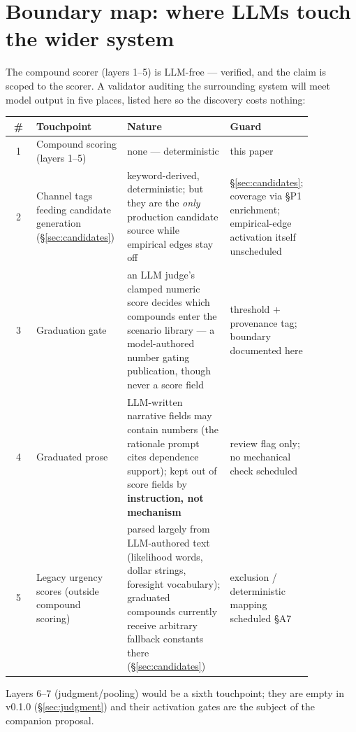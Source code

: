 \documentclass[11pt]{article}
\begin{document}
\section{Boundary map: where LLMs touch the wider system}
\label{app:boundary}

The compound scorer (layers 1--5) is LLM-free --- verified, and the claim is
scoped to the scorer. A validator auditing the surrounding system will meet
model output in five places, listed here so the discovery costs nothing:

\begin{center}\small
\begin{tabular}{@{}cp{0.30\linewidth}p{0.34\linewidth}p{0.22\linewidth}@{}}
\toprule
\# & Touchpoint & Nature & Guard \\
\midrule
1 & Compound scoring (layers 1--5) & none --- deterministic & this paper \\
2 & Channel tags feeding candidate generation (\S\ref{sec:candidates}) &
keyword-derived, deterministic; but they are the \emph{only} production
candidate source while empirical edges stay off & \S\ref{sec:candidates};
coverage via \S P1 enrichment; empirical-edge activation itself
unscheduled \\
3 & Graduation gate & an LLM judge's clamped numeric score decides which
compounds enter the scenario library --- a model-authored number gating
publication, though never a score field & threshold + provenance tag;
boundary documented here \\
4 & Graduated prose & LLM-written narrative fields may contain numbers (the
rationale prompt cites dependence support); kept out of score fields by
\textbf{instruction, not mechanism} & review flag only; no mechanical check
scheduled \\
5 & Legacy urgency scores (outside compound scoring) & parsed largely from
LLM-authored text (likelihood words, dollar strings, foresight vocabulary);
graduated compounds currently receive arbitrary fallback constants there
(\S\ref{sec:candidates}) & exclusion / deterministic mapping scheduled
\S A7 \\
\bottomrule
\end{tabular}
\end{center}

Layers 6--7 (judgment/pooling) would be a sixth touchpoint; they are empty
in v0.1.0 (\S\ref{sec:judgment}) and their activation gates are the subject
of the companion proposal.
\end{document}
